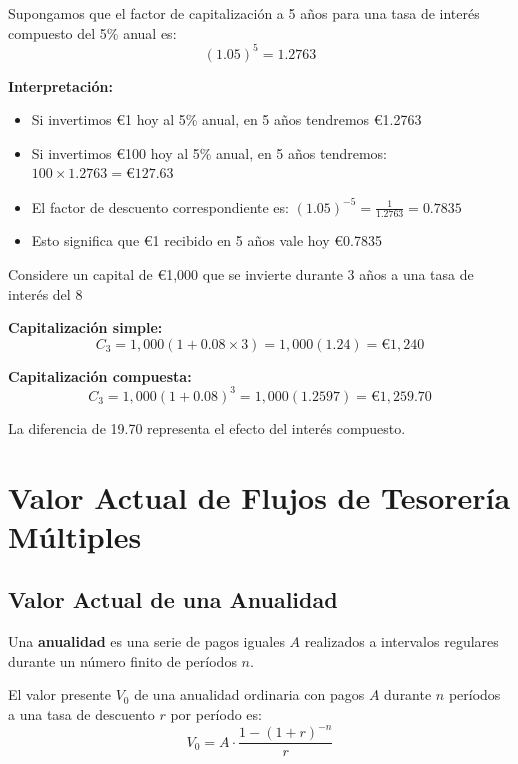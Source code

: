 \begin{ejemplo}
Supongamos que el factor de capitalización a 5 años para una tasa de interés compuesto del 5\% anual es:
$$(1.05)^5 = 1.2763$$

\textbf{Interpretación:}
\begin{itemize}
\item Si invertimos €1 hoy al 5\% anual, en 5 años tendremos €1.2763
\item Si invertimos €100 hoy al 5\% anual, en 5 años tendremos: $100 \times 1.2763 = \text{€}127.63$
\item El factor de descuento correspondiente es: $(1.05)^{-5} = \frac{1}{1.2763} = 0.7835$
\item Esto significa que €1 recibido en 5 años vale hoy €0.7835
\end{itemize}
\end{ejemplo}

\begin{ejemplo}
Considere un capital de €1,000 que se invierte durante 3 años a una tasa de interés del 8%

\textbf{Capitalización simple:}
$$C_3 = 1{,}000(1 + 0.08 \times 3) = 1{,}000(1.24) = \text{€}1{,}240$$

\textbf{Capitalización compuesta:}
$$C_3 = 1{,}000(1 + 0.08)^3 = 1{,}000(1.2597) = \text{€}1{,}259.70$$

La diferencia de 19.70 representa el efecto del interés compuesto.
\end{ejemplo}

\section{Valor Actual de Flujos de Tesorería Múltiples}

\subsection{Valor Actual de una Anualidad}

\begin{definicion}[Anualidad]
Una \textbf{anualidad} es una serie de pagos iguales $A$ realizados a intervalos regulares durante un número finito de períodos $n$.
\end{definicion}

\begin{teorema}
El valor presente $V_0$ de una anualidad ordinaria con pagos $A$ durante $n$ períodos a una tasa de descuento $r$ por período es:
\begin{equation}
V_0 = A \cdot \frac{1 - (1 + r)^{-n}}{r}
\end{equation}
\end{teorema}

